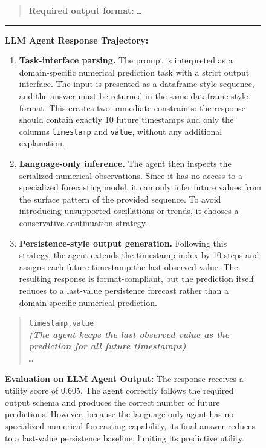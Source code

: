 \begin{figure}[h]
{\begin{tcolorbox}[colback=gray!5!white, colframe=red!60, 
title=Case Study A.1: How LLM Agent Fails a Domain-Specific Problem, boxrule=0.3mm, width=1.2\textwidth, arc=2mm, auto outer arc=true]
\begin{quote}
\textbf{Required output format:} \texttt{\ldots}\\

\end{quote}

\hrule
\vspace{3mm}

\textbf{LLM Agent Response Trajectory:}

\begin{enumerate}
    \item \textbf{Task-interface parsing.}
    The prompt is interpreted as a domain-specific numerical prediction task with a strict output interface. The input is presented as a dataframe-style sequence, and the answer must be returned in the same dataframe-style format. This creates two immediate constraints: the response should contain exactly 10 future timestamps and only the columns \texttt{timestamp} and \texttt{value}, without any additional explanation.

    \item \textbf{Language-only inference.}
    The agent then inspects the serialized numerical observations. Since it has no access to a specialized forecasting model, it can only infer future values from the surface pattern of the provided sequence. To avoid introducing unsupported oscillations or trends, it chooses a conservative continuation strategy.

    \item \textbf{Persistence-style output generation.}
    Following this strategy, the agent extends the timestamp index by 10 steps and assigns each future timestamp the last observed value. The resulting response is format-compliant, but the prediction itself reduces to a last-value persistence forecast rather than a domain-specific numerical prediction.
\end{enumerate}

\begin{quote}
\small
\texttt{timestamp,value}\\
\textbf{\textit{(The agent keeps the last observed value as the prediction for all future timestamps)}}\\
\texttt{\ldots}
\end{quote}

\textbf{Evaluation on LLM Agent Output:}
The response receives a utility score of $0.605$. The agent correctly follows the required output schema and produces the correct number of future predictions. However, because the language-only agent has no specialized numerical forecasting capability, its final answer reduces to a last-value persistence baseline, limiting its predictive utility.



\end{tcolorbox}}
\end{figure}

